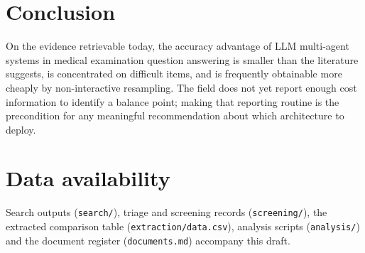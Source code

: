 \documentclass[11pt,a4paper]{article}
\begin{document}
\section{Conclusion}
On the evidence retrievable today, the accuracy advantage of LLM multi-agent systems in
medical examination question answering is smaller than the literature suggests, is
concentrated on difficult items, and is frequently obtainable more cheaply by
non-interactive resampling. The field does not yet report enough cost information to
identify a balance point; making that reporting routine is the precondition for any
meaningful recommendation about which architecture to deploy.




\appendix
\section{Data availability}
Search outputs (\texttt{search/}), triage and screening records (\texttt{screening/}),
the extracted comparison table (\texttt{extraction/data.csv}), analysis scripts
(\texttt{analysis/}) and the document register (\texttt{documents.md}) accompany this
draft.
\end{document}
